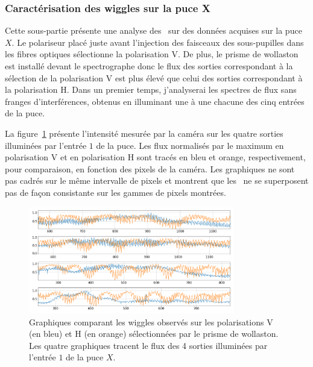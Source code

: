 \subsubsection{Caractérisation des wiggles sur la puce X}

Cette sous-partie présente une analyse des \wiggles~sur des données acquises sur la puce $X$. Le polariseur placé juste avant l'injection des faisceaux des sous-pupilles dans les fibres optiques sélectionne la polarisation V. De plus, le prisme de wollaston est installé devant le spectrographe donc le flux des sorties correspondant à la sélection de la polarisation V est plus élevé que celui des sorties correspondant à la polarisation H. Dans un premier temps, j'analyserai les spectres de flux sans franges d'interférences, obtenus en illuminant une à une chacune des cinq entrées de la puce.

La figure~\ref{fig:WigglesInput1PolaComp} présente l'intensité mesurée par la caméra sur les quatre sorties illuminées par l'entrée $1$ de la puce. Les flux normalisés par le maximum en polarisation V et en polarisation H sont tracés en bleu et orange, respectivement, pour comparaison, en fonction des pixels de la caméra. Les graphiques ne sont pas cadrés sur le même intervalle de pixels et montrent que les \wiggles~ne se superposent pas de façon consistante sur les gammes de pixels montrées.

\begin{figure}[ht!]
    \centering
    \includegraphics[width=0.8\textwidth]{Figure_Chap4/20220811_P2VM_01_Flat1_1_Spectra_PolaOpposed.png}
    \caption[Graphiques comparant les wiggles observés sur les polarisations V et H sélectionnées par le prisme de wollaston, pour la puce $X$.]{Graphiques comparant les wiggles observés sur les polarisations V (en bleu) et H (en orange) sélectionnées par le prisme de wollaston. Les quatre graphiques tracent le flux des 4 sorties illuminées par l'entrée $1$ de la puce $X$.}
    \label{fig:WigglesInput1PolaComp}
\end{figure}

